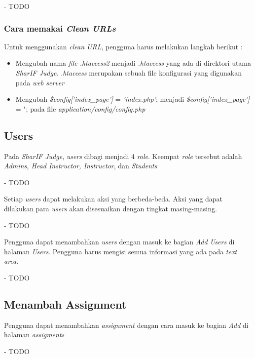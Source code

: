 - TODO

\subsubsection{Cara memakai \textit{Clean URLs}}
Untuk menggunakan \textit{clean URL}, pengguna harus melakukan langkah berikut :
\begin{itemize}
	\item Mengubah nama \textit{file .htaccess2} menjadi \textit{.htaccess} yang ada di direktori utama \textit{SharIF Judge}. \textit{.htaccess} merupakan sebuah file konfigurasi yang digunakan pada \textit{web server}
	\item Mengubah \textit{\$config['index\_page']} = \textit{'index.php'}; menjadi\textit{ \$config['index\_page']} = "; pada file \textit{application/config/config.php}
\end{itemize} 

\subsection{Users}
Pada \textit{SharIF Judge}, \textit{users} dibagi menjadi 4 \textit{role}. Keempat \textit{role} tersebut adalah \textit{Admins, Head Instructor, Instructor}, dan \textit{Students}

- TODO

Setiap \textit{users} dapat melakukan aksi yang berbeda-beda. Aksi yang dapat dilakukan para \textit{users} akan disesuaikan dengan tingkat masing-masing.

- TODO

Pengguna dapat menambahkan \textit{users} dengan masuk ke bagian \textit{Add Users} di halaman \textit{Users}. Pengguna harus mengisi semua informasi yang ada pada \textit{text area}.

- TODO

\subsection{Menambah Assignment}
Pengguna dapat menambahkan \textit{assignment} dengan cara masuk ke bagian \textit{Add} di halaman \textit{assigments}

- TODO


